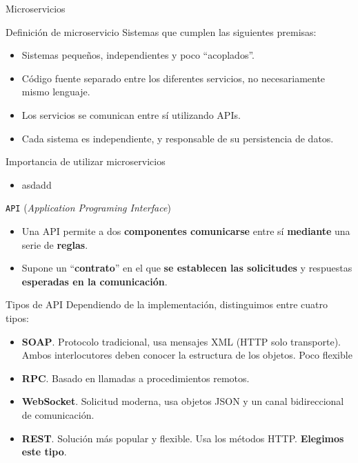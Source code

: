 \documentclass[aspectratio=169,xcolor=dvipsnames]{beamer}
\begin{document}
	\begin{frame}{Microservicios}
		\begin{exampleblock}{Definición de microservicio}
			Sistemas que cumplen las siguientes premisas: 
			
			\begin{itemize}
				\item Sistemas pequeños, independientes y poco ``acoplados''. 
				\item Código fuente separado entre los diferentes servicios, no necesariamente mismo lenguaje.
				\item Los servicios se comunican entre sí utilizando APIs.
				\item Cada sistema es independiente, y responsable de su persistencia de datos.
			\end{itemize}
		\end{exampleblock}
		
		\begin{alertblock}{Importancia de utilizar microservicios}
			\begin{itemize}
				\item asdadd
			\end{itemize}
		\end{alertblock}
	\end{frame}

	
	\begin{frame}{\texttt{API} \small (\textit{Application Programing Interface})}
		\begin{itemize}
			\item Una API permite a dos \textbf{componentes comunicarse} entre sí \textbf{mediante} una serie de \textbf{reglas}.
			
			\item Supone un ``\textbf{contrato}'' en el que \textbf{se establecen las solicitudes} y respuestas \textbf{esperadas en la comunicación}.
		\end{itemize}
	
		\begin{exampleblock}{Tipos de API}
			Dependiendo de la implementación, distinguimos entre cuatro tipos:
			
			\begin{itemize}
				\item \textbf{SOAP}. Protocolo tradicional, usa mensajes XML (HTTP solo transporte). Ambos interlocutores deben conocer la estructura de los objetos. Poco flexible
				\item \textbf{RPC}. Basado en llamadas a procedimientos remotos. 
				\item \textbf{WebSocket}. Solicitud moderna, usa objetos JSON y un canal bidireccional de comunicación.
				\item \textbf{REST}. Solución más popular y flexible. Usa los métodos HTTP. \textbf{Elegimos este tipo}.
			\end{itemize}
		\end{exampleblock}
	\end{frame}
	
\end{document}
